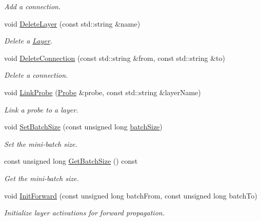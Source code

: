 \begin{DoxyCompactItemize}
\begin{DoxyCompactList}\small\item\em Add a connection. \end{DoxyCompactList}\item 
void \hyperlink{classfractal_1_1Rnn_a7eb0a079ff4771e29182e1827757faa2}{Delete\+Layer} (const std\+::string \&name)
\begin{DoxyCompactList}\small\item\em Delete a \hyperlink{classfractal_1_1Layer}{Layer}. \end{DoxyCompactList}\item 
void \hyperlink{classfractal_1_1Rnn_a0b79a070742c4f39f13267f62e36996d}{Delete\+Connection} (const std\+::string \&from, const std\+::string \&to)
\begin{DoxyCompactList}\small\item\em Delete a connection. \end{DoxyCompactList}\item 
void \hyperlink{classfractal_1_1Rnn_ad8c57efd5d6de9043f7861b7432c1208}{Link\+Probe} (\hyperlink{classfractal_1_1Probe}{Probe} \&probe, const std\+::string \&layer\+Name)
\begin{DoxyCompactList}\small\item\em Link a probe to a layer. \end{DoxyCompactList}\item 
void \hyperlink{classfractal_1_1Rnn_a9bd883f73fede973121b095c13fd8ef8}{Set\+Batch\+Size} (const unsigned long \hyperlink{classfractal_1_1Rnn_a18afcf7887c5a86d4f6cccae67646ed0}{batch\+Size})
\begin{DoxyCompactList}\small\item\em Set the mini-\/batch size. \end{DoxyCompactList}\item 
const unsigned long \hyperlink{classfractal_1_1Rnn_a10b9fb7a283460b9ea2bbaa5b9efb9ae}{Get\+Batch\+Size} () const 
\begin{DoxyCompactList}\small\item\em Get the mini-\/batch size. \end{DoxyCompactList}\item 
void \hyperlink{classfractal_1_1Rnn_a7552f1eb6e925b2996d092371d578076}{Init\+Forward} (const unsigned long batch\+From, const unsigned long batch\+To)
\begin{DoxyCompactList}\small\item\em Initialize layer activations for forward propagation. \end{DoxyCompactList}\item 

\end{DoxyCompactItemize}
